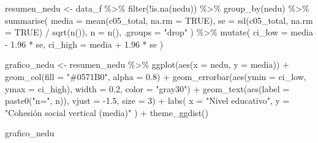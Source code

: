 \documentclass[
  spanish,
  a4paper,
  oneside]{scrbook}
\newenvironment{Shaded}{\begin{snugshade}}{\end{snugshade}}
\newcommand{\AttributeTok}[1]{\textcolor[rgb]{0.40,0.45,0.13}{#1}}
\newcommand{\ConstantTok}[1]{\textcolor[rgb]{0.56,0.35,0.01}{#1}}
\newcommand{\DecValTok}[1]{\textcolor[rgb]{0.68,0.00,0.00}{#1}}
\newcommand{\FloatTok}[1]{\textcolor[rgb]{0.68,0.00,0.00}{#1}}
\newcommand{\FunctionTok}[1]{\textcolor[rgb]{0.28,0.35,0.67}{#1}}
\newcommand{\NormalTok}[1]{\textcolor[rgb]{0.00,0.23,0.31}{#1}}
\newcommand{\OtherTok}[1]{\textcolor[rgb]{0.00,0.23,0.31}{#1}}
\newcommand{\SpecialCharTok}[1]{\textcolor[rgb]{0.37,0.37,0.37}{#1}}
\newcommand{\StringTok}[1]{\textcolor[rgb]{0.13,0.47,0.30}{#1}}
\begin{document}
\begin{Shaded}
\begin{Highlighting}[]
\NormalTok{resumen\_nedu }\OtherTok{\textless{}{-}}\NormalTok{ data\_f }\SpecialCharTok{\%\textgreater{}\%}
  \FunctionTok{filter}\NormalTok{(}\SpecialCharTok{!}\FunctionTok{is.na}\NormalTok{(nedu)) }\SpecialCharTok{\%\textgreater{}\%}
  \FunctionTok{group\_by}\NormalTok{(nedu) }\SpecialCharTok{\%\textgreater{}\%}
  \FunctionTok{summarise}\NormalTok{(}
    \AttributeTok{media   =} \FunctionTok{mean}\NormalTok{(c05\_total, }\AttributeTok{na.rm =} \ConstantTok{TRUE}\NormalTok{),}
    \AttributeTok{se      =} \FunctionTok{sd}\NormalTok{(c05\_total, }\AttributeTok{na.rm =} \ConstantTok{TRUE}\NormalTok{) }\SpecialCharTok{/} \FunctionTok{sqrt}\NormalTok{(}\FunctionTok{n}\NormalTok{()),}
    \AttributeTok{n       =} \FunctionTok{n}\NormalTok{(),}
    \AttributeTok{.groups =} \StringTok{"drop"}
\NormalTok{  ) }\SpecialCharTok{\%\textgreater{}\%}
  \FunctionTok{mutate}\NormalTok{(}
    \AttributeTok{ci\_low  =}\NormalTok{ media }\SpecialCharTok{{-}} \FloatTok{1.96} \SpecialCharTok{*}\NormalTok{ se,}
    \AttributeTok{ci\_high =}\NormalTok{ media }\SpecialCharTok{+} \FloatTok{1.96} \SpecialCharTok{*}\NormalTok{ se}
\NormalTok{  )}

\NormalTok{grafico\_nedu }\OtherTok{\textless{}{-}}\NormalTok{ resumen\_nedu }\SpecialCharTok{\%\textgreater{}\%}
  \FunctionTok{ggplot}\NormalTok{(}\FunctionTok{aes}\NormalTok{(}\AttributeTok{x =}\NormalTok{ nedu, }\AttributeTok{y =}\NormalTok{ media)) }\SpecialCharTok{+}
  \FunctionTok{geom\_col}\NormalTok{(}\AttributeTok{fill =} \StringTok{"\#0571B0"}\NormalTok{, }\AttributeTok{alpha =} \FloatTok{0.8}\NormalTok{) }\SpecialCharTok{+}
  \FunctionTok{geom\_errorbar}\NormalTok{(}\FunctionTok{aes}\NormalTok{(}\AttributeTok{ymin =}\NormalTok{ ci\_low, }\AttributeTok{ymax =}\NormalTok{ ci\_high),}
                \AttributeTok{width =} \FloatTok{0.2}\NormalTok{, }\AttributeTok{color =} \StringTok{"gray30"}\NormalTok{) }\SpecialCharTok{+}
  \FunctionTok{geom\_text}\NormalTok{(}\FunctionTok{aes}\NormalTok{(}\AttributeTok{label =} \FunctionTok{paste0}\NormalTok{(}\StringTok{"n="}\NormalTok{, n)), }\AttributeTok{vjust =} \SpecialCharTok{{-}}\FloatTok{1.5}\NormalTok{, }\AttributeTok{size =} \DecValTok{3}\NormalTok{) }\SpecialCharTok{+}
  \FunctionTok{labs}\NormalTok{(}
    \AttributeTok{x =} \StringTok{"Nivel educativo"}\NormalTok{,}
    \AttributeTok{y =} \StringTok{"Cohesión social vertical (media)"}
\NormalTok{  ) }\SpecialCharTok{+}
  \FunctionTok{theme\_ggdist}\NormalTok{()}

\NormalTok{grafico\_nedu}
\end{Highlighting}
\end{Shaded}
\end{document}
